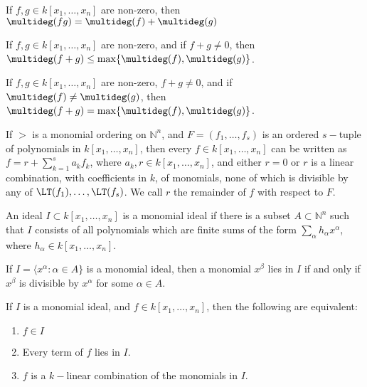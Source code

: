 \documentclass[crop=false,class=article,oneside]{standalone}
\begin{document}
            \begin{theorem}
                If $f,g\in k[x_1,\hdots ,x_n]$ are non-zero,
                then $\multideg(fg)=\multideg(f)+\multideg(g)$
            \end{theorem}
            \begin{theorem}
                If $f,g\in k[x_1,\hdots ,x_n]$ are non-zero,
                and if $f+g\ne 0$, then
                $\multideg(f+g)\leq\max\{\multideg(f),\multideg(g)\}$.
            \end{theorem}
            \begin{theorem}
                If $f,g\in k[x_1,\hdots ,x_n]$ are non-zero,
                $f+g\ne 0$, and if
                $\multideg(f)\ne\multideg(g)$, then
                $\multideg(f+g)=\max\{\multideg(f),\multideg(g)\}$.
            \end{theorem}
            \begin{theorem}
                If $>$ is a monomial ordering on $\mathbb{N}^n$,
                and $F=(f_1,\hdots,f_s)$ is an ordered $s-$tuple
                of polynomials in $k[x_1,\hdots ,x_n]$,
                then every $f\in k[x_1,\hdots ,x_n]$ can be
                written as $f=r+\sum_{k=1}^{s}a_{k}f_{k}$,
                where $a_{k},r\in{k}[x_{1},\hdots,x_{n}]$,
                and either $r=0$ or $r$ is a linear combination,
                with coefficients in $k$, of monomials, none of
                which is divisible by any of
                $\LT(f_{1}),\hdots,\LT(f_{s})$.
                We call $r$ the remainder of $f$
                with respect to $F$.
            \end{theorem}
            \begin{definition}
                An ideal $I\subset k[x_1,\hdots ,x_n]$ is a
                monomial ideal if there is a subset
                $A\subset\mathbb{N}^{n}$ such that $I$ consists
                of all polynomials which are finite sums of
                the form $\sum_{\alpha} h_{\alpha}x^{\alpha}$,
                where $h_{\alpha}\in {k}[x_{1},\hdots,x_{n}]$. 
            \end{definition}
            \begin{theorem}
                If $I=\langle x^\alpha: \alpha \in A\}$ is
                a monomial ideal, then a monomial $x^\beta$ lies
                in $I$ if and only if $x^\beta$ is divisible by
                $x^\alpha$ for some $\alpha \in A$.
            \end{theorem}
            \begin{theorem}
                If $I$ is a monomial ideal, and
                $f\in{k}[x_{1},\hdots,x_{n}]$, then
                the following are equivalent:
                \begin{enumerate}
                        \item $f\in I$
                        \item Every term of $f$ lies in $I$.
                        \item $f$ is a $k-$linear combination
                              of the monomials in $I$.
                \end{enumerate}
            \end{theorem}
\end{document}
